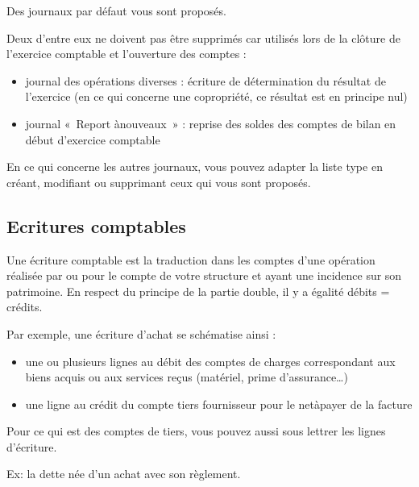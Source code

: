 \documentclass[a4paper,10pt,oneside,french]{sphinxmanual}
\begin{document}
\sphinxAtStartPar
Des journaux par défaut vous sont proposés.

\sphinxAtStartPar
Deux d’entre eux ne doivent pas être supprimés car utilisés lors de la clôture de l’exercice comptable et l’ouverture des comptes :
\begin{itemize}
\item {} 
\sphinxAtStartPar
journal des opérations diverses : écriture de détermination du résultat de l’exercice (en ce qui concerne une copropriété, ce résultat est en principe nul)

\item {} 
\sphinxAtStartPar
journal « Report à\sphinxhyphen{}nouveaux » : reprise des soldes des comptes de bilan en début d’exercice comptable

\end{itemize}

\sphinxAtStartPar
En ce qui concerne les autres journaux, vous pouvez adapter la liste type en créant, modifiant ou supprimant ceux qui vous sont proposés.


\subsection{Ecritures comptables}
\label{\detokenize{accounting/definition:ecritures-comptables}}
\sphinxAtStartPar
Une écriture comptable est la traduction dans les comptes d’une opération réalisée par ou pour le compte de votre structure et ayant une incidence sur son patrimoine. En respect du principe de la partie double, il y a égalité débits = crédits.

\sphinxAtStartPar
Par exemple, une écriture d’achat se schématise ainsi :
\begin{itemize}
\item {} 
\sphinxAtStartPar
une ou plusieurs lignes au débit des comptes de charges correspondant aux biens acquis ou aux services reçus (matériel, prime d’assurance…)

\item {} 
\sphinxAtStartPar
une ligne au crédit du compte tiers fournisseur pour le net\sphinxhyphen{}à\sphinxhyphen{}payer de la facture

\end{itemize}

\sphinxAtStartPar
Pour ce qui est des comptes de tiers, vous pouvez aussi sous  lettrer les lignes d’écriture.

\sphinxAtStartPar
Ex: la dette née d’un achat avec son règlement.
\end{document}
